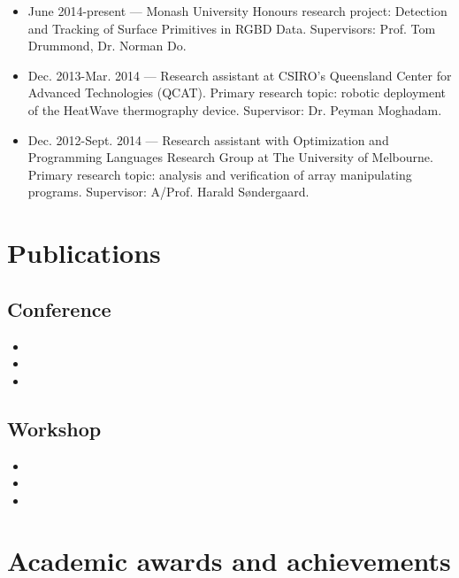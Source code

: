 \documentclass[12pt,a4paper]{article}
\begin{document}
\begin{itemize}
  \item June 2014-present --- Monash University Honours research project:
    Detection and Tracking of Surface Primitives in RGBD Data. Supervisors:
    Prof. Tom Drummond, Dr. Norman Do.

  \item Dec. 2013-Mar. 2014 --- Research assistant at CSIRO's Queensland Center
    for Advanced Technologies (QCAT). Primary research topic: robotic
    deployment of the HeatWave thermography device. Supervisor: Dr. Peyman
    Moghadam.

  \item Dec. 2012-Sept. 2014 --- Research assistant with Optimization and
    Programming Languages Research Group at The University of Melbourne.
    Primary research topic: analysis and verification of array manipulating
    programs. Supervisor: A/Prof. Harald S\o ndergaard.
\end{itemize}

\section*{Publications}

\subsection*{Conference}

\begin{itemize}
  \item {}
  \item {}
  \item {}
\end{itemize}

\subsection*{Workshop}

\begin{itemize}
  \item {}
  \item {}
  \item {}
\end{itemize}

\section*{Academic awards and achievements}
\end{document}
